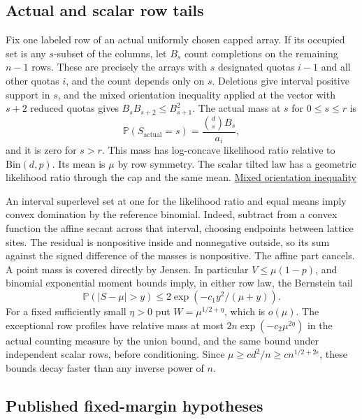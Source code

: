 \documentclass[11pt]{article}
\begin{document}
\subsection{Actual and scalar row tails}

Fix one labeled row of an actual uniformly chosen capped array. If
its occupied set is any $s$-subset of the columns, let $B_s$ count
completions on the remaining $n-1$ rows. These are precisely the
arrays with $s$ designated quotas $i-1$ and all other quotas $i$,
and the count depends only on $s$. Deletions give interval positive
support in $s$, and the mixed orientation inequality applied at
the vector with $s+2$ reduced quotas gives $B_sB_{s+2}\le B_{s+1}^2$.
The actual mass at $s$ for $0\le s\le r$ is
\[
\mathbb P(S_{\mathrm{actual}}=s)=\frac{\binom ds B_s}{a_i},
\]
and it is zero for $s>r$. This mass has log-concave likelihood ratio relative to
$\mathrm{Bin}(d,p)$. Its mean is $\mu$ by row symmetry. The scalar
tilted law has a geometric likelihood ratio through the cap and
the same mean. \href{https://github.com/ProgramComputer/open-math-research/blob/main/topics/balanced-arrays/orientation-normalization.md\#extension-across-two-coordinates}{Mixed orientation inequality}

An interval superlevel set at one for the likelihood ratio and equal
means imply convex domination by the reference binomial. Indeed,
subtract from a convex function the affine secant across that
interval, choosing endpoints between lattice sites. The residual
is nonpositive inside and nonnegative outside, so its sum against
the signed difference of the masses is nonpositive. The affine
part cancels. A point mass is covered directly by Jensen.
In particular $V\le\mu(1-p)$, and binomial exponential moment
bounds imply, in either row law, the Bernstein tail
\[
\mathbb P(|S-\mu|>y)\le 2\exp(-c_1 y^2/(\mu+y)).
\tag{2}
\]
For a fixed sufficiently small $\eta>0$ put $W=\mu^{1/2+\eta}$,
which is $o(\mu)$. The exceptional row profiles have relative
mass at most $2n\exp(-c_2\mu^{2\eta})$ in the actual counting
measure by the union bound, and the same bound under independent
scalar rows, before conditioning. Since
$\mu\ge c d^2/n\ge c n^{1/2+2\epsilon}$, these bounds decay faster
than any inverse power of $n$.

\subsection{Published fixed-margin hypotheses}
\end{document}

